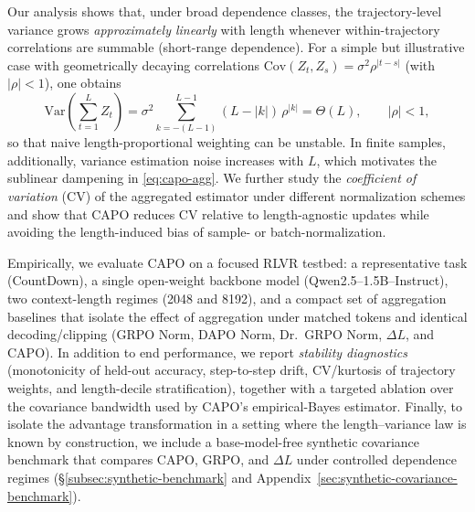 Our analysis shows that, under broad dependence classes, the trajectory-level variance grows \emph{approximately linearly} with length whenever within-trajectory correlations are summable (short-range dependence). For a simple but illustrative case with geometrically decaying correlations $\mathrm{Cov}(Z_t,Z_s)=\sigma^2\rho^{|t-s|}$ (with $|\rho|<1$), one obtains
\begin{equation}
\label{eq:linear-variance}
\mathrm{Var}\left(\sum_{t=1}^{L} Z_t\right)
=
\sigma^2 \sum_{k=-(L-1)}^{L-1} (L-|k|)\,\rho^{|k|}
= \Theta(L),
\qquad |\rho|<1,
\end{equation}
so that naive length-proportional weighting can be unstable. In finite samples, additionally, variance estimation noise increases with $L$, which motivates the sublinear dampening in \eqref{eq:capo-agg}. We further study the \emph{coefficient of variation} (CV) of the aggregated estimator under different normalization schemes and show that CAPO reduces CV relative to length-agnostic updates while avoiding the length-induced bias of sample- or batch-normalization.

Empirically, we evaluate CAPO on a focused RLVR testbed: a representative task (CountDown), a single open-weight backbone model (Qwen2.5--1.5B--Instruct), two context-length regimes (2048 and 8192), and a compact set of aggregation baselines that isolate the effect of aggregation under matched tokens and identical decoding/clipping (GRPO Norm, DAPO Norm, Dr.~GRPO Norm, $\Delta L$, and CAPO). In addition to end performance, we report \emph{stability diagnostics} (monotonicity of held-out accuracy, step-to-step drift, CV/kurtosis of trajectory weights, and length-decile stratification), together with a targeted ablation over the covariance bandwidth used by CAPO's empirical-Bayes estimator. Finally, to isolate the advantage transformation in a setting where the length--variance law is known by construction, we include a base-model-free synthetic covariance benchmark that compares CAPO, GRPO, and $\Delta L$ under controlled dependence regimes (\S\ref{subsec:synthetic-benchmark} and Appendix~\ref{sec:synthetic-covariance-benchmark}).

